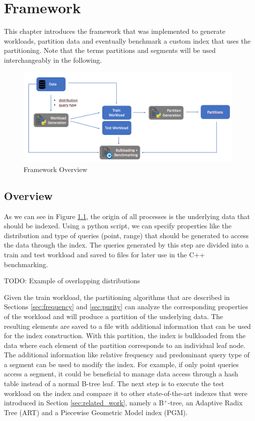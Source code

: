 \thispagestyle{plain}
\chapter{Framework}
This chapter introduces the framework that was implemented to generate workloads, partition data and eventually benchmark a custom index that uses the partitioning. Note that the terms partitions and segments will be used interchangeably in the following.
\begin{figure}[H]
    \centering
    \includegraphics[width=\textwidth]{figures/pipeline.png}
    \caption{Framework Overview}
    \label{fig:framework}
\end{figure}

\section{Overview}
As we can see in Figure \ref{fig:framework}, the origin of all processes is the underlying data that should be indexed. Using a python script, we can specify properties like the distribution and type of queries (point, range) that should be generated to access the data through the index. The queries generated by this step are divided into a train and test workload and saved to files for later use in the C++ benchmarking.

TODO: Example of overlapping distributions

Given the train workload, the partitioning algorithms that are described in Sections \ref{sec:frequency} and \ref{sec:purity} can analyze the corresponding properties of the workload and will produce a partition of the underlying data. The resulting elements are saved to a file with additional information that can be used for the index construction.
With this partition, the index is bulkloaded from the data where each element of the partition corresponds to an individual leaf node. The additional information like relative frequency and predominant query type of a segment can be used to modify the index. For example, if only point queries access a segment, it could be beneficial to manage data access through a hash table instead of a normal B-tree leaf. The next step is to execute the test workload on the index and compare it to other state-of-the-art indexes that were introduced in Section \ref{sec:related_work}, namely a B$^+$-tree, an Adaptive Radix Tree (ART) and a Piecewise Geometric Model index (PGM).

